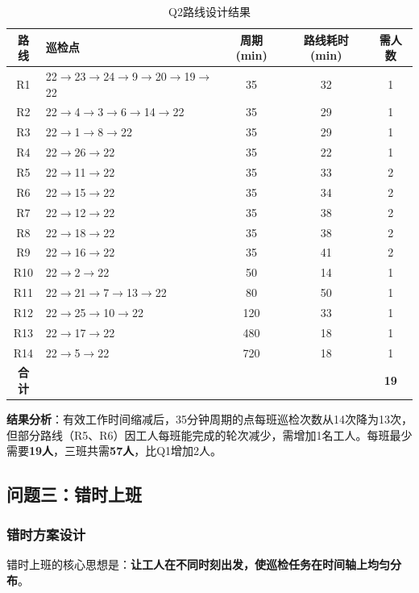 \documentclass[12pt,a4paper]{article}
\begin{document}
\begin{table}[H]
\centering
\caption{Q2路线设计结果}
\label{tab:q2_routes}
\small
\begin{tabular}{clccc}
\toprule
\textbf{路线} & \textbf{巡检点} & \textbf{周期(min)} & \textbf{路线耗时(min)} & \textbf{需人数} \\
\midrule
R1 & 22$\to$23$\to$24$\to$9$\to$20$\to$19$\to$22 & 35 & 32 & 1 \\
R2 & 22$\to$4$\to$3$\to$6$\to$14$\to$22 & 35 & 29 & 1 \\
R3 & 22$\to$1$\to$8$\to$22 & 35 & 29 & 1 \\
R4 & 22$\to$26$\to$22 & 35 & 22 & 1 \\
R5 & 22$\to$11$\to$22 & 35 & 33 & 2 \\
R6 & 22$\to$15$\to$22 & 35 & 34 & 2 \\
R7 & 22$\to$12$\to$22 & 35 & 38 & 2 \\
R8 & 22$\to$18$\to$22 & 35 & 38 & 2 \\
R9 & 22$\to$16$\to$22 & 35 & 41 & 2 \\
R10 & 22$\to$2$\to$22 & 50 & 14 & 1 \\
R11 & 22$\to$21$\to$7$\to$13$\to$22 & 80 & 50 & 1 \\
R12 & 22$\to$25$\to$10$\to$22 & 120 & 33 & 1 \\
R13 & 22$\to$17$\to$22 & 480 & 18 & 1 \\
R14 & 22$\to$5$\to$22 & 720 & 18 & 1 \\
\midrule
\textbf{合计} & & & & \textbf{19} \\
\bottomrule
\end{tabular}
\end{table}

\textbf{结果分析}：有效工作时间缩减后，35分钟周期的点每班巡检次数从14次降为13次，但部分路线（R5、R6）因工人每班能完成的轮次减少，需增加1名工人。每班最少需要\textbf{19人}，三班共需\textbf{57人}，比Q1增加2人。

\subsection{问题三：错时上班}

\subsubsection{错时方案设计}

错时上班的核心思想是：\textbf{让工人在不同时刻出发，使巡检任务在时间轴上均匀分布}。
\end{document}
